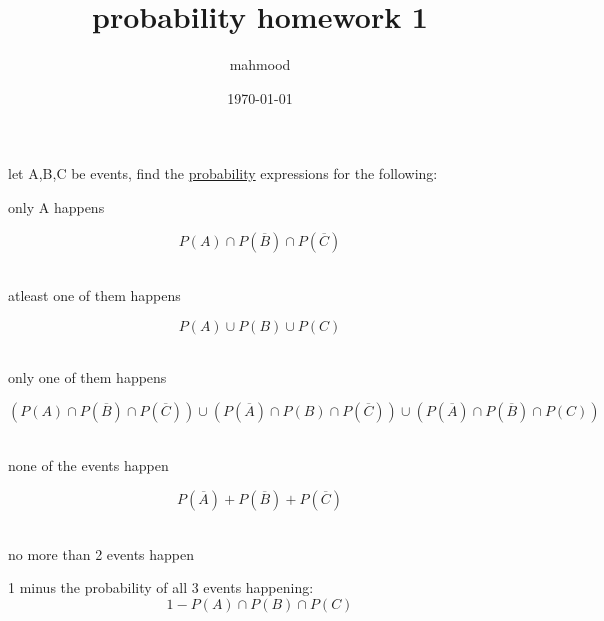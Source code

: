 \documentclass[a4paper,12pt]{article}
\author{mahmood}
\date{\today}
\title{probability homework 1}
\begin{document}
\maketitle
\begin{question}
let A,B,C be events, find the \href{probability.org}{probability} expressions for the following:\\
\begin{subquestion}
only A happens\\
\begin{answer}
\[
P(A) \cap P\left(\overline{B}\right) \cap P\left(\overline{C}\right)
\]\\
\end{answer}
\end{subquestion}
\begin{subquestion}
atleast one of them happens\\
\begin{answer}
\[
P(A) \cup P(B) \cup P(C)
\]\\
\end{answer}
\end{subquestion}
\begin{subquestion}
only one of them happens\\
\begin{answer}
\[
\left(P(A) \cap P(\overline{B}) \cap P(\overline{C})\right) \cup \left(P(\overline{A}) \cap P(B) \cap P(\overline{C})\right) \cup \left(P(\overline{A}) \cap P(\overline{B}) \cap P(C)\right)
\]\\
\end{answer}
\end{subquestion}
\begin{subquestion}
none of the events happen\\
\begin{answer}
\[
P(\overline{A})+P(\overline{B})+P(\overline{C})
\]\\
\end{answer}
\end{subquestion}
\begin{subquestion}
no more than 2 events happen\\
\begin{answer}
1 minus the probability of all 3 events happening:\\
\[
1 - P(A) \cap P(B) \cap P(C)
\]\\
\end{answer}
\end{subquestion}
\end{question}
\end{document}
